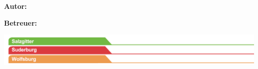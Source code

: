 \begin{titlepage}
	\hspace{1cm}
	\begin{minipage}{\dimexpr\textwidth-1.5cm\relax}
		{\Large\textsf{\textbf{Autor:} \\\documentAuthor}}
		
		\vspace{0.5cm}		
		
		{\Large\textsf{\textbf{Betreuer:} \\\documentTutor}}
	\end{minipage}
	
	\vspace{2em}
	
	
	\enlargethispage{10\baselineskip}
	
	\includegraphics[scale=1.20]{./images/logos/sublogo_sz-sud-wob.jpg}
	

\end{titlepage}

\restoregeometry